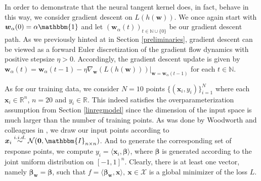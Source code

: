 \documentclass{article}
\begin{document}
In order to demonstrate that the neural tangent kernel does, in fact, behave in this way, we consider gradient descent on $L(h(\boldsymbol{w}))$. We once again start with $\boldsymbol{w}_{\alpha}(0) = \alpha \mathbbm{1}$ and let $(\boldsymbol{w}_{\alpha}(t))_{t \in \mathbb{N} \cup \{ 0\}}$ be our gradient descent path. As we previously hinted at in Section \ref{preliminaries}, gradient descent can be viewed as a forward Euler discretization of the gradient flow dynamics with positive stepsize $\eta > 0$. Accordingly, the gradient descent update is given by $\boldsymbol{w}_{\alpha}(t) = \boldsymbol{w}_{\alpha}(t-1) - \eta \nabla_{\boldsymbol{w}} (L(h(\boldsymbol{w})))|_{\boldsymbol{w} = \boldsymbol{w}_{\alpha}(t-1)}$ for each $t \in \mathbb{N}$.

As for our training data, we consider $N=10$ points $\{ (\boldsymbol{x}_i, y_i) \}_{i=1}^N$ where each $\boldsymbol{x}_i \in \mathbb{R}^{n}$, $n = 20$ and $y_i \in \mathbb{R}$. This indeed satisfies the overparameterization assumption from Section \ref{linregmodel} since the dimension of the input space is much larger than the number of training points. As was done by Woodworth and colleagues in \cite{woodworth2020kernel}, we draw our input points according to $\boldsymbol{x}_i \overset{i.i.d.}{\sim} \mathcal{N}(\boldsymbol{0}, \mathbbm{I}_{n \times n})$. And to generate the corresponding set of response points, we compute $y_i = \langle \boldsymbol{x}_i, \boldsymbol{\beta} \rangle$, where $\boldsymbol{\beta}$ is generated according to the joint uniform distribution on $[-1, 1]^n$. Clearly, there is at least one vector, namely $\boldsymbol{\beta}_{\boldsymbol{w}} = \boldsymbol{\beta}$, such that $f = \langle \boldsymbol{\beta}_{\boldsymbol{w}}, \boldsymbol{x} \rangle, \ \boldsymbol{x} \in \mathcal{X}$ is a global minimizer of the loss $L$.
\end{document}
